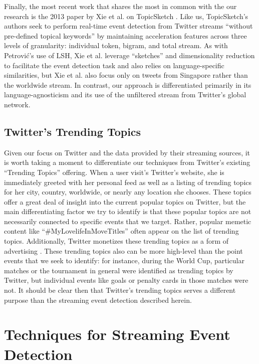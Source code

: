 \documentclass{acm_proc_article-sp}
\begin{document}
Finally, the most recent work that shares the most in common with the our research is the 2013 paper by Xie et al. on TopicSketch \cite{xie2013topicsketch}.
Like us, TopicSketch's authors seek to perform real-time event detection from Twitter streams ``without pre-defined topical keywords'' by maintaining acceleration features across three levels of granularity: individual token, bigram, and total stream.
As with Petrovi\'{c}'s use of LSH, Xie et al. leverage ``sketches'' and dimensionality reduction to facilitate the event detection task and also relies on language-specific similarities, but Xie et al. also focus only on tweets from Singapore rather than the worldwide stream.
In contrast, our approach is differentiated primarily in its language-agnosticism and its use of the unfiltered stream from Twitter's global network.

\subsection{Twitter's Trending Topics}

Given our focus on Twitter and the data provided by their streaming sources, it is worth taking a moment to differentiate our techniques from Twitter's existing ``Trending Topics'' offering.
When a user visit's Twitter's website, she is immediately greeted with her personal feed as well as a listing of trending topics for her city, country, worldwide, or nearly any location she chooses.
These topics offer a great deal of insight into the current popular topics on Twitter, but the main differentiating factor we try to identify is that these popular topics are not necessarily connected to specific events that we target.
Rather, popular memetic content like ``\#MyLovelifeInMoveTitles'' often appear on the list of trending topics.
Additionally, Twitter monetizes these trending topics as a form of advertising \cite{Sydell2011}.  
These trending topics also can be more high-level than the point events that we seek to identify: for instance, during the World Cup, particular matches or the tournament in general were identified as trending topics by Twitter, but individual events like goals or penalty cards in those matches were not.
It should be clear then that Twitter's trending topics serves a different purpose than the streaming event detection described herein.

\section{Techniques for Streaming Event Detection}
\label{sect:methods}
\end{document}
